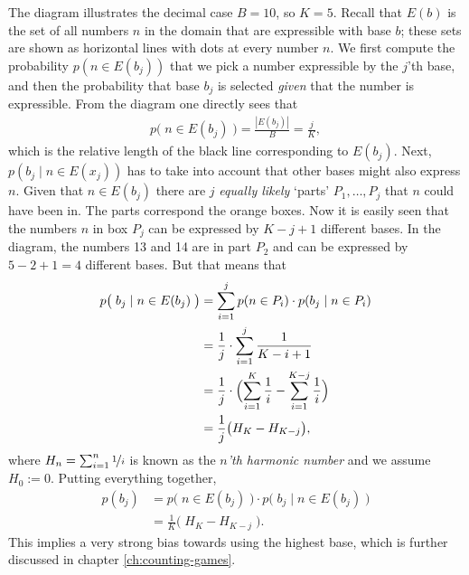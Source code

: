 \documentclass{../src/bcthesispart}
\begin{document}
The diagram illustrates the decimal case $B = 10$, so $K=5$. 
Recall that $E(b)$ is the set of all numbers $n$ in the domain that are expressible with base $b$; 
these sets are shown as horizontal lines with dots at every number $n$.
We first compute the probability $p(n \in E(b_j))$ that we pick a number expressible by the $j$’th base, and then the probability that base $b_j$ is selected \emph{given} that the number is expressible.
From the diagram one directly sees that
\begin{align}
	p\bigl( \; n \in E(b_j) \; \bigr) 
		= \frac{|E(b_j)|}{B} 
		= \frac{j}{K},
\end{align}
which is the relative length of the black line corresponding to $E(b_j)$.
Next, $p(b_j \mid n \in E(x_j))$ has to take into account that other bases might also express $n$. 
Given that $n \in E(b_j)$ there are $j$ \emph{equally likely} ‘parts’ $P_1, \dots, P_j$ that $n$ could have been in. 
The parts correspond the orange boxes.
Now it is easily seen that the numbers $n$ in box $P_j$ can be expressed by $K - j+ 1$ different bases.
In the diagram, the numbers 13 and 14 are in part $P_2$ and can be expressed by $5-2+1 = 4$ different bases.
But that means that
\begin{align}
	p\bigl( \; b_j \mid n \in E(b_j) \; \bigr)
		&= \sum_{i=1}^j 
			p(n \in P_i) 
			\cdot p(b_j \mid n \in P_i)
		\\
		&= \frac{1}{j} 
			\cdot \sum_{i=1}^j \frac{1}{K - i + 1}
		\\
		&= \frac{1}{j} \cdot \Bigl( 
				\sum_{i=1}^K \frac{1}{i} 
				- \sum_{i=1}^{K-j} \frac{1}{i} 
			\Bigr)
		\\
		&= \frac{1}{j} \bigl( H_K - H_{K-j} \bigr),
\end{align}
where $H_n = \sum_{i=1}^n \nicefrac{1}{i}$ is known as the \emph{$n$’th harmonic number} and we assume $H_0 := 0$.
Putting everything together,
\begin{align}
	p(b_j) 
		&= p\bigl( \; n \in E(b_j) \; \bigr)
			\cdot p\bigl( \; b_j \mid n \in E(b_j) \; \bigr)
		\\
		&= \frac{1}{K} \bigl(\; H_K - H_{K-j} \;\bigr).
		\label{eq:app-counting-games:bias}
\end{align}
This implies a very strong bias towards using the highest base, which is further discussed in chapter \ref{ch:counting-games}.
\end{document}
